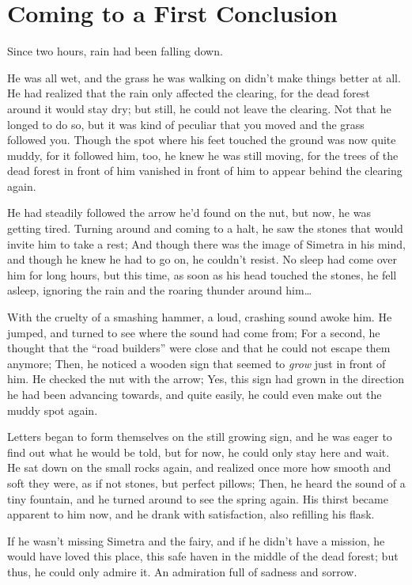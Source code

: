 \chapter{Coming to a First Conclusion}
\label{cha:coming-first-concl}
Since two hours, rain had been falling down.

He was all wet, and the grass he was walking on didn't make things better at all. He had realized that the rain only affected the clearing, for the dead forest around it would stay dry; but still, he could not leave the clearing. Not that he longed to do so, but it was kind of peculiar that you moved and the grass followed you. Though the spot where his feet touched the ground was now quite muddy, for it followed him, too, he knew he was still moving, for the trees of the dead forest in front of him vanished in front of him to appear behind the clearing again.

He had steadily followed the arrow he'd found on the nut, but now, he was getting tired. Turning around and coming to a halt, he saw the stones that would invite him to take a rest; And though there was the image of Simetra in his mind, and though he knew he had to go on, he couldn't resist. No sleep had come over him for long hours, but this time, as soon as his head touched the stones, he fell asleep, ignoring the rain and the roaring thunder around him\dots

With the cruelty of a smashing hammer, a loud, crashing sound awoke him. 
He jumped, and turned to see where the sound had come from; For a second, he thought that the \enquote{road builders} were close and that he could not escape them anymore;
Then, he noticed a wooden sign that seemed to \emph{grow} just in front of him.
He checked the nut with the arrow; Yes, this sign had grown in the direction he had been advancing towards, and quite easily, he could even make out the muddy spot again.

Letters began to form themselves on the still growing sign, and he was eager to find out what he would be told, but for now, he could only stay here and wait. 
He sat down on the small rocks again, and realized once more how smooth and soft they were, as if not stones, but perfect pillows; Then, he heard the sound of a tiny fountain, and he turned around to see the spring again. His thirst became apparent to him now, and he drank with satisfaction, also refilling his flask.

If he wasn't missing Simetra and the fairy, and if he didn't have a mission, he would have loved this place, this safe haven in the middle of the dead forest; but thus, he could only admire it. 
An admiration full of sadness and sorrow.

